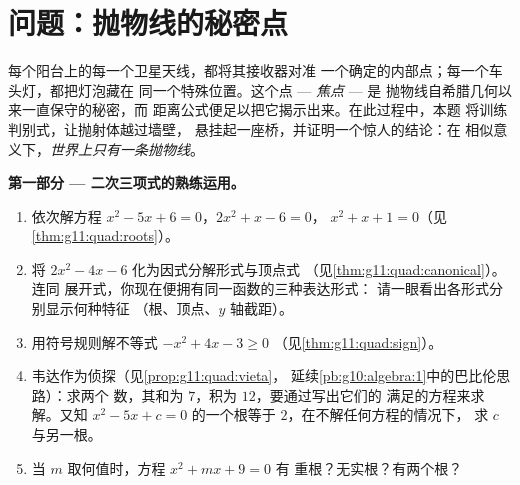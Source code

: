 \section{问题：抛物线的秘密点}

\begin{problem}
\label{pb:g11:quad:1}
每个阳台上的每一个卫星天线，都将其接收器对准
一个确定的内部点；每一个车头灯，都把灯泡藏在
同一个特殊位置。这个点 --- \emph{焦点} --- 是
抛物线自希腊几何以来一直保守的秘密，而
距离公式便足以把它揭示出来。在此过程中，本题
将训练判别式，让抛射体越过墙壁，
悬挂起一座桥，并证明一个惊人的结论：在
相似意义下，\emph{世界上只有一条抛物线}。

\medskip
\noindent\textbf{第一部分 --- 二次三项式的熟练运用。}
\begin{enumerate}
  \item 依次解方程 $x^2 - 5x + 6 = 0$，$2x^2 + x - 6 = 0$，
        $x^2 + x + 1 = 0$（见\cref{thm:g11:quad:roots}）。
  \item 将 $2x^2 - 4x - 6$ 化为因式分解形式与顶点式
        （见\cref{thm:g11:quad:canonical}）。连同
        展开式，你现在便拥有同一函数的三种表达形式：
        请一眼看出各形式分别显示何种特征
        （根、顶点、$y$ 轴截距）。
  \item 用符号规则解不等式 $-x^2 + 4x - 3 \geq 0$
        （见\cref{thm:g11:quad:sign}）。
  \item 韦达作为侦探（见\cref{prop:g11:quad:vieta}，
        延续\cref{pb:g10:algebra:1}中的巴比伦思路）：求两个
        数，其和为 $7$，积为 $12$，要通过写出它们的
        满足的方程来求解。又知 $x^2 - 5x + c = 0$ 的一个根等于
        $2$，在不解任何方程的情况下，
        求 $c$ 与另一根。
  \item 当 $m$ 取何值时，方程 $x^2 + mx + 9 = 0$ 有
        重根？无实根？有两个根？
\end{enumerate}


\end{problem}
